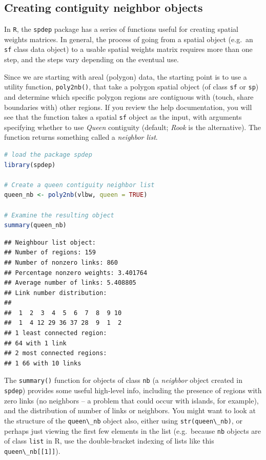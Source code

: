\documentclass[
]{book}
\newcommand{\passthrough}[1]{#1}
\begin{document}
\hypertarget{creating-contiguity-neighbor-objects}{%
\subsection{Creating contiguity neighbor objects}\label{creating-contiguity-neighbor-objects}}

In \passthrough{\lstinline!R!}, the \passthrough{\lstinline!spdep!} package has a series of functions useful for creating spatial weights matrices. In general, the process of going from a spatial object (e.g.~an \passthrough{\lstinline!sf!} class data object) to a usable spatial weights matrix requires more than one step, and the steps vary depending on the eventual use.

Since we are starting with areal (polygon) data, the starting point is to use a utility function, \passthrough{\lstinline!poly2nb()!}, that take a polygon spatial object (of class \passthrough{\lstinline!sf!} or \passthrough{\lstinline!sp!}) and determine which specific polygon regions are contiguous with (touch, share boundaries with) other regions. If you review the help documentation, you will see that the function takes a spatial \passthrough{\lstinline!sf!} object as the input, with arguments specifying whether to use \emph{Queen} contiguity (default; \emph{Rook} is the alternative). The function returns something called a \emph{neighbor list}.

\begin{lstlisting}[language=R]
# load the package spdep
library(spdep)

# Create a queen contiguity neighbor list
queen_nb <- poly2nb(vlbw, queen = TRUE)

# Examine the resulting object
summary(queen_nb)
\end{lstlisting}

\begin{lstlisting}
## Neighbour list object:
## Number of regions: 159 
## Number of nonzero links: 860 
## Percentage nonzero weights: 3.401764 
## Average number of links: 5.408805 
## Link number distribution:
## 
##  1  2  3  4  5  6  7  8  9 10 
##  1  4 12 29 36 37 28  9  1  2 
## 1 least connected region:
## 64 with 1 link
## 2 most connected regions:
## 1 66 with 10 links
\end{lstlisting}

The \passthrough{\lstinline!summary()!} function for objects of class \passthrough{\lstinline!nb!} (a \emph{neighbor} object created in \passthrough{\lstinline!spdep!}) provides some useful high-level info, including the presence of regions with zero links (no neighbors -- a problem that could occur with islands, for example), and the distribution of number of links or neighbors. You might want to look at the structure of the \passthrough{\lstinline!queen\_nb!} object also, either using \passthrough{\lstinline!str(queen\_nb)!}, or perhaps just viewing the first few elements in the list (e.g.~because \passthrough{\lstinline!nb!} objects are of class \passthrough{\lstinline!list!} in R, use the double-bracket indexing of lists like this \passthrough{\lstinline!queen\_nb[[1]]!}).
\end{document}
